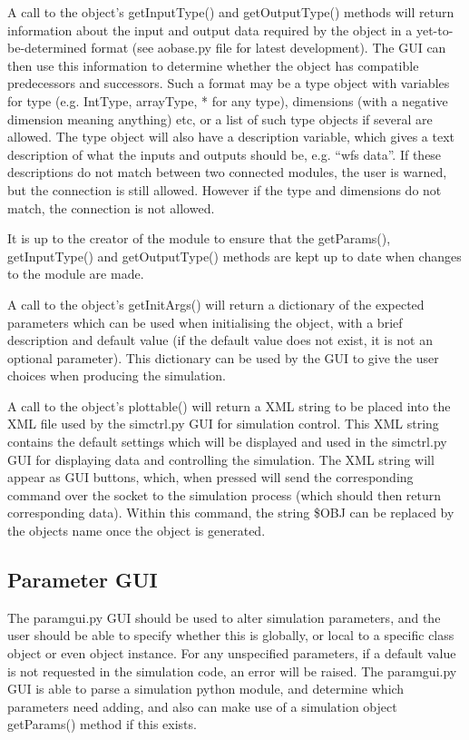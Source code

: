 \documentclass{article}
\begin{document}
A call to the object's getInputType() and getOutputType() methods will
return information about the input and output data required by the
object in a yet-to-be-determined format (see aobase.py file for latest
development).  The GUI can then use this information to determine
whether the object has compatible predecessors and successors.
Such a format may be a type object with variables for type
(e.g. IntType, arrayType, * for any type), dimensions (with a negative
dimension meaning anything) etc, or a list of such type objects if
several are allowed.  The type object will also have a description
variable, which gives a text description of what the inputs and
outputs should be, e.g. ``wfs data''.  If these descriptions do not
match between two connected modules, the user is warned, but the
connection is still allowed.  However if the type and dimensions do
not match, the connection is not allowed.

It is up to the creator of the module to ensure that the getParams(),
getInputType() and getOutputType() methods are kept up to date when
changes to the module are made.

A call to the object's getInitArgs() will return a dictionary of the
expected parameters which can be used when initialising the object,
with a brief description and default value (if the default value does
not exist, it is not an optional parameter).  This dictionary can be
used by the GUI to give the user choices when producing the
simulation.

A call to the object's plottable() will return a XML string to be
placed into the XML file used by the simctrl.py GUI for simulation
control.  This XML string contains the default settings which will be
displayed and used in the simctrl.py GUI for displaying data and
controlling the simulation.  The XML string will appear as GUI
buttons, which, when pressed will send the corresponding command over
the socket to the simulation process (which should then return
corresponding data).  Within this command, the string \$OBJ can be
replaced by the objects name once the object is generated.

\subsection{Parameter GUI}
The paramgui.py GUI should be used to alter simulation parameters, and
the user should be able to specify whether this is globally, or local
to a specific class object or even object instance.  For any
unspecified parameters, if a default value is not requested in the
simulation code, an error will be raised.  The paramgui.py GUI is able
to parse a simulation python module, and determine which parameters
need adding, and also can make use of a simulation object getParams()
method if this exists.
\end{document}
